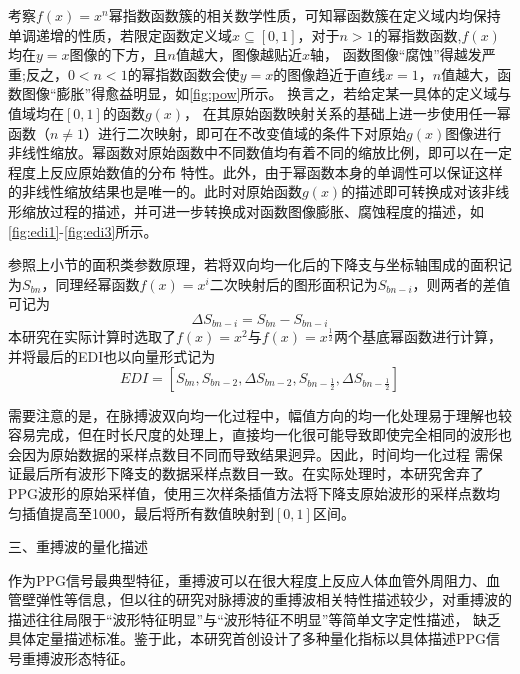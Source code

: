 
考察$f(x)=x^n$幂指数函数簇的相关数学性质，可知幂函数簇在定义域内均保持单调递增的性质，若限定函数定义域$x\subseteq [0,1]$，对于$n>1$的幂指数函数,$f(x)$均在$y=x$图像的下方，且$n$值越大，图像越贴近$x$轴，
函数图像“腐蚀”得越发严重;反之，$0<n<1$的幂指数函数会使$y=x$的图像趋近于直线$x=1$，$n$值越大，函数图像“膨胀”得愈益明显，如\autoref{fig:pow}所示。
换言之，若给定某一具体的定义域与值域均在$[0,1]$的函数$g(x)$，
在其原始函数映射关系的基础上进一步使用任一幂函数（$n\neq 1$）进行二次映射，即可在不改变值域的条件下对原始$g(x)$图像进行非线性缩放。幂函数对原始函数中不同数值均有着不同的缩放比例，即可以在一定程度上反应原始数值的分布
特性。此外，由于幂函数本身的单调性可以保证这样的非线性缩放结果也是唯一的。此时对原始函数$g(x)$的描述即可转换成对该非线形缩放过程的描述，并可进一步转换成对函数图像膨胀、腐蚀程度的描述，如\autoref{fig:edi1}-\autoref{fig:edi3}所示。

参照上小节的面积类参数原理，若将双向均一化后的下降支与坐标轴围成的面积记为$S_{bn}$，同理经幂函数$f(x)=x^i$二次映射后的图形面积记为$S_{bn-i}$，则两者的差值可记为
\begin{equation}
    \label{equ:sbn}
    \Delta S_{bn-i}=S_{bn}-S_{bn-i}
\end{equation}
本研究在实际计算时选取了$f(x)=x^2$与$f(x)=x^{\frac{1}{2}}$两个基底幂函数进行计算，并将最后的EDI也以向量形式记为
\begin{equation}
    \label{equ:edi}
    EDI=[S_{bn},S_{bn-2},\Delta S_{bn-2},S_{bn-\frac{1}{2}},\Delta S_{bn-\frac{1}{2}}]
\end{equation}

需要注意的是，在脉搏波双向均一化过程中，幅值方向的均一化处理易于理解也较容易完成，但在时长尺度的处理上，直接均一化很可能导致即使完全相同的波形也会因为原始数据的采样点数目不同而导致结果迥异。因此，时间均一化过程
需保证最后所有波形下降支的数据采样点数目一致。在实际处理时，本研究舍弃了PPG波形的原始采样值，使用三次样条插值方法将下降支原始波形的采样点数均匀插值提高至1000，最后将所有数值映射到$[0,1]$区间。

三、重搏波的量化描述

作为PPG信号最典型特征，重搏波可以在很大程度上反应人体血管外周阻力、血管壁弹性等信息，但以往的研究对脉搏波的重搏波相关特性描述较少，对重搏波的描述往往局限于“波形特征明显”与“波形特征不明显”等简单文字定性描述，
缺乏具体定量描述标准。鉴于此，本研究首创设计了多种量化指标以具体描述PPG信号重搏波形态特征。

